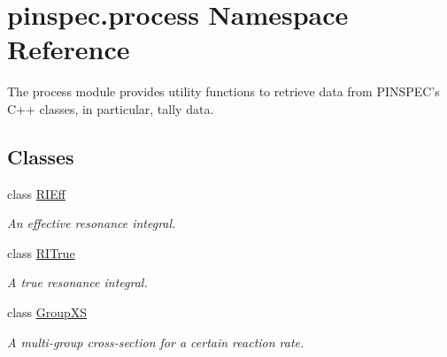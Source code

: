 \hypertarget{namespacepinspec_1_1process}{\section{pinspec.\-process Namespace Reference}
\label{namespacepinspec_1_1process}
}


The process module provides utility functions to retrieve data from P\-I\-N\-S\-P\-E\-C's C++ classes, in particular, tally data.  


\subsection*{Classes}
\begin{DoxyCompactItemize}
\item 
class \hyperlink{classpinspec_1_1process_1_1RIEff}{R\-I\-Eff}
\begin{DoxyCompactList}\small\item\em An effective resonance integral. \end{DoxyCompactList}\item 
class \hyperlink{classpinspec_1_1process_1_1RITrue}{R\-I\-True}
\begin{DoxyCompactList}\small\item\em A true resonance integral. \end{DoxyCompactList}\item 
class \hyperlink{classpinspec_1_1process_1_1GroupXS}{Group\-X\-S}
\begin{DoxyCompactList}\small\item\em A multi-\/group cross-\/section for a certain reaction rate. \end{DoxyCompactList}\end{DoxyCompactItemize}
